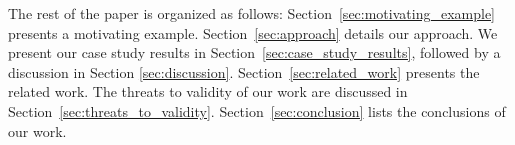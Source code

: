 %
%


The rest of the paper is organized as follows:  Section~\ref{sec:motivating_example} presents a motivating example. Section~\ref{sec:approach} details our approach. We present our case study results in Section~\ref{sec:case_study_results}, followed by a discussion in Section \ref{sec:discussion}. Section~\ref{sec:related_work} presents the related work. The threats to validity of our work are discussed in Section~\ref{sec:threats_to_validity}. Section~\ref{sec:conclusion} lists the conclusions of our work.